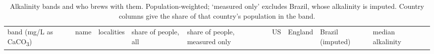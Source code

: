 \documentclass[
  a4paper,
]{article}
\author{}
\date{}
\begin{document}
\begin{longtable}[]{@{}
  >{\raggedright\arraybackslash}p{}
  >{\raggedright\arraybackslash}p{}
  >{\raggedright\arraybackslash}p{}
  >{\raggedright\arraybackslash}p{}
  >{\raggedright\arraybackslash}p{}
  >{\raggedright\arraybackslash}p{}
  >{\raggedright\arraybackslash}p{}
  >{\raggedright\arraybackslash}p{}
  >{\raggedright\arraybackslash}p{}
  >{\raggedright\arraybackslash}p{}@{}}
\caption{Alkalinity bands and who brews with them. Population-weighted;
`measured only' excludes Brazil, whose alkalinity is imputed. Country
columns give the share of that country's population in the
band.}\label{tbl-bands}\tabularnewline
\toprule\noalign{}
\begin{minipage}[b]{\linewidth}\raggedright
band (mg/L as CaCO\textsubscript{3})
\end{minipage} & \begin{minipage}[b]{\linewidth}\raggedright
name
\end{minipage} & \begin{minipage}[b]{\linewidth}\raggedright
localities
\end{minipage} & \begin{minipage}[b]{\linewidth}\raggedright
share of people, all
\end{minipage} & \begin{minipage}[b]{\linewidth}\raggedright
share of people, measured only
\end{minipage} & \begin{minipage}[b]{\linewidth}\raggedright
US
\end{minipage} & \begin{minipage}[b]{\linewidth}\raggedright
England
\end{minipage} & \begin{minipage}[b]{\linewidth}\raggedright
Brazil (imputed)
\end{minipage} & \begin{minipage}[b]{\linewidth}\raggedright
median alkalinity
\end{minipage} & \begin{minipage}[b]{\linewidth}\raggedright

\end{minipage}
\end{longtable}
\end{document}
